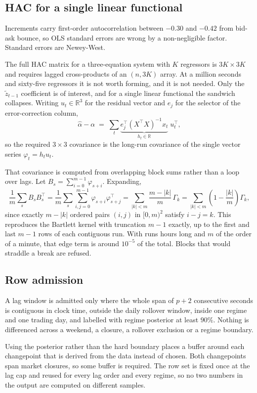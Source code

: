 \documentclass[11pt,a4paper]{article}
\begin{document}
\subsection{HAC for a single linear functional}

Increments carry first-order autocorrelation between $-0.30$ and $-0.42$ from bid-ask
bounce, so OLS standard errors are wrong by a non-negligible factor. Standard errors are
Newey-West.

The full HAC matrix for a three-equation system with $K$ regressors is $3K \times 3K$ and
requires lagged cross-products of an $(n, 3K)$ array. At a million seconds and sixty-five
regressors it is not worth forming, and it is not needed. Only the $\tilde z_{t-1}$
coefficient is of interest, and for a single linear functional the sandwich collapses.
Writing $u_t \in \mathbb{R}^3$ for the residual vector and $e_j$ for the selector of the
error-correction column,
\[
\hat\alpha - \alpha
\;=\; \sum_t \underbrace{e_j^{\top}(X^{\top}X)^{-1} x_t}_{\textstyle h_t \in \mathbb{R}}
\; u_t^{\top},
\]
so the required $3 \times 3$ covariance is the long-run covariance of the single vector
series $\varphi_t = h_t u_t$.

That covariance is computed from overlapping block sums rather than a loop over lags. Let
$B_s = \sum_{i=0}^{m-1} \varphi_{s+i}$. Expanding,
\[
\frac{1}{m}\sum_s B_s B_s^{\top}
= \frac{1}{m}\sum_s \sum_{i,j=0}^{m-1} \varphi_{s+i}\varphi_{s+j}^{\top}
= \sum_{|k| < m} \frac{m - |k|}{m}\, \Gamma_k
= \sum_{|k| < m}\left(1 - \frac{|k|}{m}\right)\Gamma_k ,
\]
since exactly $m - |k|$ ordered pairs $(i,j)$ in $[0,m)^2$ satisfy $i - j = k$. This
reproduces the Bartlett kernel with truncation $m-1$ exactly, up to the first and last $m-1$
rows of each contiguous run. With runs hours long and $m$ of the order of a minute, that
edge term is around $10^{-5}$ of the total. Blocks that would straddle a break are refused.

\subsection{Row admission}

A lag window is admitted only where the whole span of $p+2$ consecutive seconds is
contiguous in clock time, outside the daily rollover window, inside one regime and one
trading day, and labelled with regime posterior at least $90\%$. Nothing is differenced
across a weekend, a closure, a rollover exclusion or a regime boundary.

Using the posterior rather than the hard boundary places a buffer around each changepoint
that is derived from the data instead of chosen. Both changepoints span market closures, so
some buffer is required. The row set is fixed once at the lag cap and reused for every lag
order and every regime, so no two numbers in the output are computed on different samples.
\end{document}
